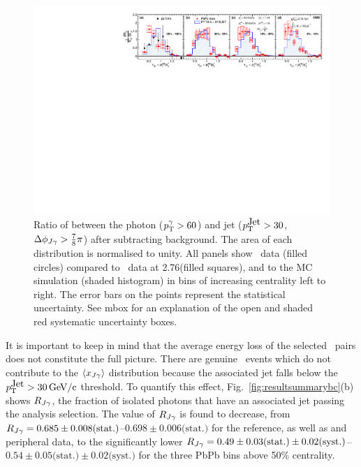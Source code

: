 \begin{figure}[!h]
\begin{center}
\includegraphics[width=0.98\mboxwidth]{jetfigures/Photonv7_Paper_InclPtRatio_all_cent4_G60J30_subDPhi1SS1_Isol0_Norm1log1.pdf}
\caption[]{\label{fig:InclPtRatio_qcdPhoRef_pp2760-xJ30G60} Ratio of \pt{} between the
  photon ($p_{\rm{T}}^{\gamma} > 60$\GeVc) and jet ($p_{\rm{T}}^{\mbox{Jet}} > 30$\GeVc, $\Delta\phi_{J\gamma} > \frac{7}{8}\pi$)
  after subtracting background. The area of each distribution is normalised to unity. All panels show
\PbPb\ data (filled circles) compared to \pp\ data at
  2.76\TeV (filled squares), and to the \PYTHYD{} MC simulation
  (shaded histogram) in bins of increasing centrality left to right. The error bars
  on the points represent the statistical uncertainty.
  See mbox for an explanation of the open and shaded red systematic
  uncertainty boxes.
}
\label{fig:GR:CMS_xjg}
\end{center}
\end{figure}

It is important to keep in mind that the average energy loss of the selected \photonjet\ pairs does not constitute the full picture.
There are genuine \photonjet\ events which do not contribute to the $\langle x_{J\gamma}\rangle$ distribution
because the associated  jet falls below the $p_{\mathrm{T}}^{\mbox{Jet}} > 30\,\mathrm{GeV/c}$ threshold.
To quantify this effect, Fig.~\ref{fig:resultsummarybc}(b) shows $R_{J\gamma}$, the fraction of isolated photons that have an associated jet passing the analysis selection.
The value of $R_{J\gamma}$ is found to
decrease, from $R_{J\gamma} = 0.685\pm 0.008\mbox{(stat.)}$--$0.698\pm 0.006\mbox{(stat.)}$ for the \PYTHYD{} reference,
as well as \pp{} and peripheral \PbPb{} data, to the significantly
lower $R_{J\gamma} = 0.49\pm 0.03\mbox{(stat.)}\pm 0.02\mbox{(syst.)}$--$0.54\pm 0.05\mbox{(stat.)}\pm 0.02\mbox{(syst.)}$ for
the three PbPb bins
above 50\% centrality.

